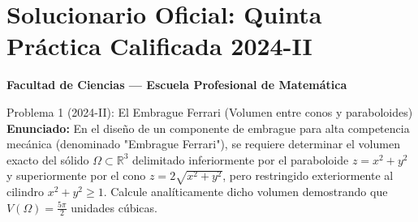 \documentclass[11pt,a4paper]{article}
\begin{document}
\section{Solucionario Oficial: Quinta Práctica Calificada 2024-II}
\textbf{Facultad de Ciencias --- Escuela Profesional de Matemática}\\[0.2cm]

\begin{ejerciciobox}{Problema 1 (2024-II): El Embrague Ferrari (Volumen entre conos y paraboloides)}
\textbf{Enunciado:} En el diseño de un componente de embrague para alta competencia mecánica (denominado "Embrague Ferrari"), se requiere determinar el volumen exacto del sólido $\Omega \subset \mathbb{R}^3$ delimitado inferiormente por el paraboloide $z = x^2 + y^2$ y superiormente por el cono $z = 2\sqrt{x^2 + y^2}$, pero restringido exteriormente al cilindro $x^2 + y^2 \geq 1$.
Calcule analíticamente dicho volumen demostrando que $V(\Omega) = \frac{5\pi}{2}$ unidades cúbicas.


\end{ejerciciobox}
\end{document}

